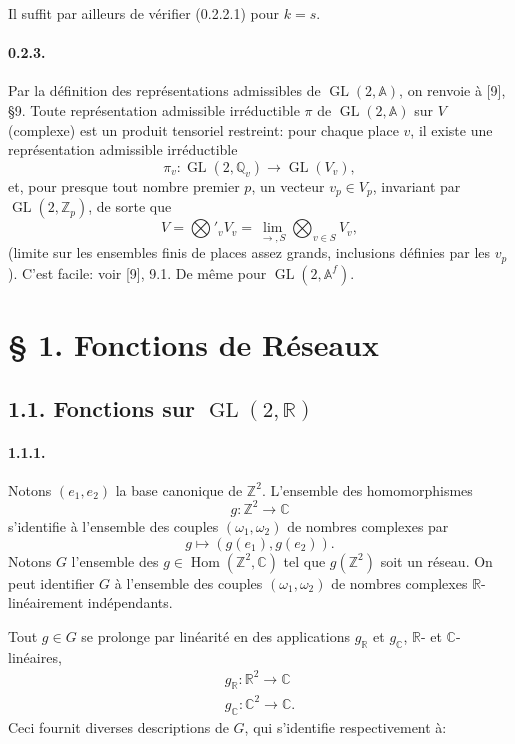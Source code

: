 \documentclass[10pt,a4paper]{article}
\providecommand{\GL}{\operatorname{GL}}
\providecommand{\Hom}{\operatorname{Hom}}
\providecommand{\R}{\mathbb R}
\providecommand{\Q}{\mathbb Q}
\providecommand{\Z}{\mathbb Z}
\providecommand{\C}{\mathbb C}
\providecommand{\A}{\mathbb A}
\begin{document}
\clearpage
{}
\hypertarget{authority-8}{}
Il suffit par ailleurs de vérifier (0.2.2.1) pour $k=s$.

\paragraph{0.2.3.} Par la définition des représentations admissibles de $\GL(2,\A)$, on renvoie à [9], §9. Toute représentation admissible irréductible $\pi$ de $\GL(2,\A)$ sur $V$ (complexe) est un produit tensoriel restreint: pour chaque place $v$, il existe une représentation admissible irréductible
\[
\pi_v:\GL(2,\Q_v)\longrightarrow\GL(V_v),
\]
et, pour presque tout nombre premier $p$, un vecteur $v_p\in V_p$, invariant par $\GL(2,\Z_p)$, de sorte que
\[
V=\mathop{\bigotimes}\nolimits'_v V_v=\lim_{\longrightarrow,S}\bigotimes_{v\in S}V_v,
\]
(limite sur les ensembles finis de places assez grands, inclusions définies par les $v_p$). C'est facile: voir [9], 9.1. De même pour $\GL(2,\A^f)$.

\section*{§ 1. Fonctions de Réseaux}

\subsection*{1.1. Fonctions sur $\GL(2,\R)$}

\paragraph{1.1.1.} Notons $(e_1,e_2)$ la base canonique de $\Z^2$. L'ensemble des homomorphismes
\[
g:\Z^2\longrightarrow\C
\]
s'identifie à l'ensemble des couples $(\omega_1,\omega_2)$ de nombres complexes par
\[
g\longmapsto(g(e_1),g(e_2)).
\]
Notons $G$ l'ensemble des $g\in\Hom(\Z^2,\C)$ tel que $g(\Z^2)$ soit un réseau. On peut identifier $G$ à l'ensemble des couples $(\omega_1,\omega_2)$ de nombres complexes $\R$-linéairement indépendants.

Tout $g\in G$ se prolonge par linéarité en des applications $g_{\R}$ et $g_{\C}$, $\R$- et $\C$-linéaires,
\[
\begin{gathered}
g_{\R}:\R^2\longrightarrow\C\\
g_{\C}:\C^2\longrightarrow\C.
\end{gathered}
\]
Ceci fournit diverses descriptions de $G$, qui s'identifie respectivement à:
\end{document}
